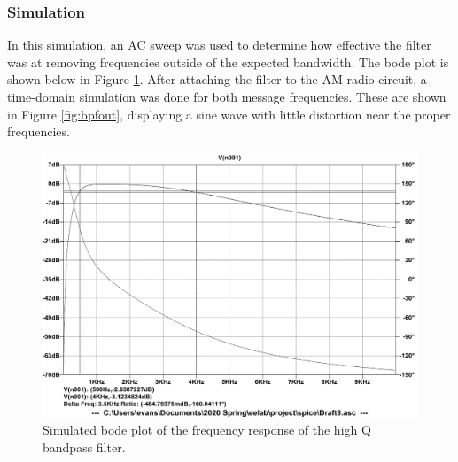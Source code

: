\documentclass[11pt,letter,notitlepage]{article}
\begin{document}
	\clearpage
	\subsubsection{Simulation}
	In this simulation, an AC sweep was used to determine how effective the filter was at removing frequencies outside of the expected bandwidth. The bode plot is shown below in Figure \ref{fig:bpfresp}. After attaching the filter to the AM radio circuit, a time-domain simulation was done for both message frequencies. These are shown in Figure \ref{fig:bpfout}, displaying a sine wave with little distortion near the proper frequencies.
	
	\vfil 
	
	\begin{figure}[h]
		\centering
		\includegraphics[width=\linewidth,clip,trim=0 1.1em 0 1.2em]{bpf/bpfresp}
		\caption{Simulated bode plot of the frequency response of the high Q bandpass filter.}
		\label{fig:bpfresp}
	\end{figure}
\end{document}
